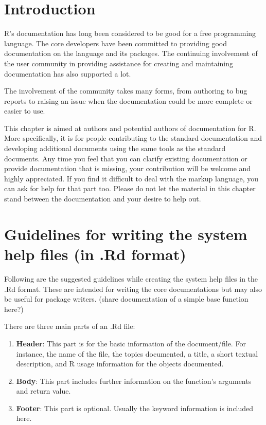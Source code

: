 \documentclass[
]{book}
\begin{document}
\hypertarget{introduction-2}{%
\section{Introduction}\label{introduction-2}}

R's documentation has long been considered to be good for a free programming language. The core developers have been committed to providing good documentation on the language and its packages. The continuing involvement of the user community in providing assistance for creating and maintaining documentation has also supported a lot.

The involvement of the community takes many forms, from authoring to bug reports to raising an issue when the documentation could be more complete or easier to use.

This chapter is aimed at authors and potential authors of documentation for R. More specifically, it is for people contributing to the standard documentation and developing additional documents using the same tools as the standard documents. Any time you feel that you can clarify existing documentation or provide documentation that is missing, your contribution will be welcome and highly appreciated. If you find it difficult to deal with the markup language, you can ask for help for that part too. Please do not let the material in this chapter stand between the documentation and your desire to help out.

\hypertarget{guidelines-for-writing-the-system-help-files-in-.rd-format}{%
\section{Guidelines for writing the system help files (in .Rd format)}\label{guidelines-for-writing-the-system-help-files-in-.rd-format}}

Following are the suggested guidelines while creating the system help files in the .Rd format. These are intended for writing the core documentations but may also be useful for package writers. (share documentation of a simple base function here?)

There are three main parts of an .Rd file:

\begin{enumerate}
\def\labelenumi{\arabic{enumi}.}
\item
  \textbf{Header}: This part is for the basic information of the document/file. For instance, the name of the file, the topics documented, a title, a short textual description, and R usage information for the objects documented.
\item
  \textbf{Body}: This part includes further information on the function's arguments and return value.
\item
  \textbf{Footer}: This part is optional. Usually the keyword information is included here.
\end{enumerate}
\end{document}
